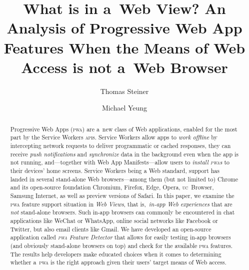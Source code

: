 \documentclass[sigconf]{acmart}
\begin{document}
\title[What is in a~Web View?]{What is in a~Web View?
An Analysis of Progressive Web App Features
When the Means of Web Access is not a~Web Browser}  



\author{Thomas Steiner}

\author{Michael Yeung}


\begin{abstract}
Progressive Web Apps (\textsc{pwa}) are a~new class of Web applications,
enabled for the most part by the Service Workers \textsc{api}s.
Service Workers allow apps to \emph{work offline}
by intercepting network requests to deliver programmatic or cached responses,
they can receive \emph{push notifications} and \emph{synchronize} data in the background
even when the app is not running,
and---together with Web App Manifests---allow users to \emph{install \textsc{pwa}s}
to their devices' home screens.
Service Workers being a Web standard, support has landed in several
stand-alone Web browsers---among them (but not limited to)
Chrome and its open-source foundation Chromium, Firefox, Edge, Opera,
\textsc{uc}~Browser, Samsung Internet, as well as preview versions of Safari.
In this paper, we examine the \textsc{pwa} feature support situation in \emph{Web Views},
that is,\ \emph{in-app Web experiences} that are \emph{not} stand-alone browsers.
Such in-app browsers can commonly be encountered in chat applications like WeChat or WhatsApp,
online social networks like Facebook or Twitter, but also email clients like Gmail.
We have developed an open-source application called \emph{\textsc{pwa} Feature Detector}
that allows for easily testing in-app browsers (and obviously stand-alone browsers on top)
and check for the available \textsc{pwa} features.
The results help developers make educated choices when it comes to determining
whether a~\textsc{pwa} is the right approach given their users' target means of Web access.
\end{abstract}
\end{document}
